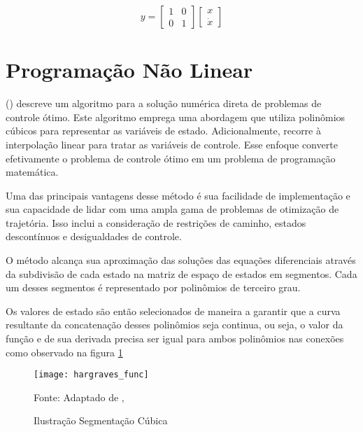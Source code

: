 \begin{equation}
    \label{eq:saida_ref}
    y
    =
    \begin{bmatrix}
        1 & 0 \\
        0 & 1
    \end{bmatrix}
    \begin{bmatrix}
        x \\
        \dot x
    \end{bmatrix}
\end{equation}

\section{Programação Não Linear}
\label{sec:hargraves}

\citeauthor{hargraves87} (\citeyear{hargraves87}) descreve um algoritmo para a solução numérica direta de problemas de controle ótimo. Este algoritmo emprega uma abordagem que utiliza polinômios cúbicos para representar as variáveis de estado. Adicionalmente, recorre à interpolação linear para tratar as variáveis de controle. Esse enfoque converte efetivamente o problema de controle ótimo em um problema de programação matemática.

Uma das principais vantagens desse método é sua facilidade de implementação e sua capacidade de lidar com uma ampla gama de problemas de otimização de trajetória. Isso inclui a consideração de restrições de caminho, estados descontínuos e desigualdades de controle.

O método alcança sua aproximação das soluções das equações diferenciais através da subdivisão de cada estado na matriz de espaço de estados em segmentos. Cada um desses segmentos é representado por polinômios de terceiro grau.

Os valores de estado são então selecionados de maneira a garantir que a curva resultante da concatenação desses polinômios seja continua, ou seja, o valor da função e de sua derivada precisa ser igual para ambos polinômios nas conexões como observado na figura \ref{fig:hargraves_fun}

\begin{figure}[H]
    \centering
    \caption{Ilustração Segmentação Cúbica}
    \texttt{[image: hargraves\_func]}

    {\footnotesize Fonte: Adaptado de \citeauthor{hargraves87}, \citeyear{hargraves87}}
    \label{fig:hargraves_fun}
\end{figure}


